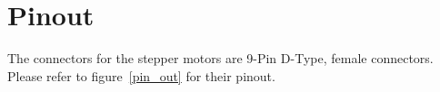 




\section{Pinout}
The connectors for the stepper motors are 9-Pin D-Type, female connectors. Please refer to figure~\ref{pin_out} for their pinout.

